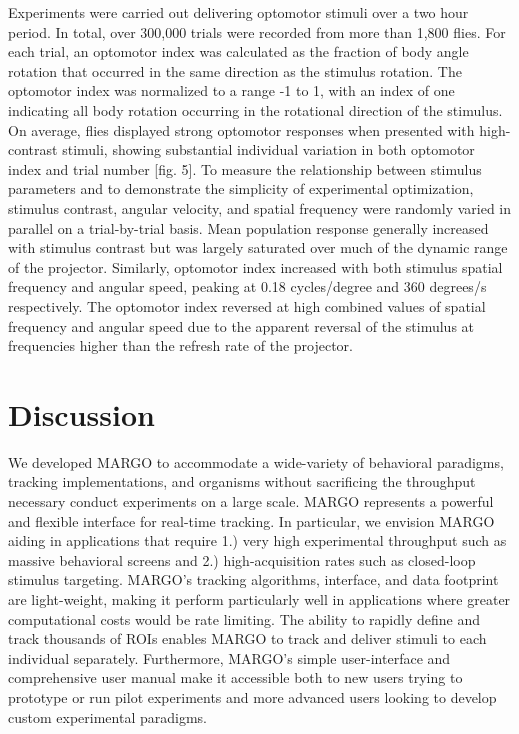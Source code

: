 \documentclass[10pt]{article}
\begin{document}
\begin{multicols}{2}
Experiments were carried out delivering optomotor stimuli over a two hour period. In total, over 300,000 trials were recorded from more than 1,800 flies. For each trial, an optomotor index was calculated as the fraction of body angle rotation that occurred in the same direction as the stimulus rotation. The optomotor index was normalized to a range -1 to 1, with an index of one indicating all body rotation occurring in the rotational direction of the stimulus. On average, flies displayed strong optomotor responses when presented with high-contrast stimuli, showing substantial individual variation in both optomotor index and trial number [fig. 5]. To measure the relationship between stimulus parameters and to demonstrate the simplicity of experimental optimization, stimulus contrast, angular velocity, and spatial frequency were randomly varied in parallel on a trial-by-trial basis. Mean population response generally increased with stimulus contrast but was largely saturated over much of the dynamic range of the projector. Similarly, optomotor index increased with both stimulus spatial frequency and angular speed, peaking at 0.18 cycles/degree and 360 degrees/s respectively. The optomotor index reversed at high combined values of spatial frequency and angular speed due to the apparent reversal of the stimulus at frequencies higher than the refresh rate of the projector.


\section*{Discussion}

We developed MARGO to accommodate a wide-variety of behavioral paradigms, tracking implementations, and organisms without sacrificing the throughput necessary conduct experiments on a large scale. MARGO represents a  powerful and flexible interface for real-time tracking. In particular, we envision MARGO aiding in applications that require 1.) very high experimental throughput such as massive behavioral screens and 2.) high-acquisition rates such as closed-loop stimulus targeting. MARGO's tracking algorithms, interface, and data footprint are light-weight, making it perform particularly well in applications where greater computational costs would be rate limiting. The ability to rapidly define and track thousands of ROIs enables MARGO to track and deliver stimuli to each individual separately. Furthermore, MARGO's simple user-interface and comprehensive user manual make it accessible both to new users trying to prototype or run pilot experiments and more advanced users looking to develop custom experimental paradigms.


\end{multicols}
\end{document}
